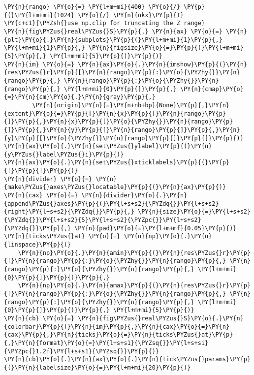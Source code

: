 \begin{Verbatim}[commandchars=\\\{\}]
\PY{n}{rango} \PY{o}{=} \PY{l+m+mi}{400} \PY{o}{/} \PY{p}{(}\PY{l+m+mi}{1024} \PY{o}{/} \PY{n}{nkx}\PY{p}{)}
\PY{c+c1}{\PYZsh{}use np.clip for truncating the Z range}
\PY{n}{fig\PYZus{}real\PYZus{}S}\PY{p}{,} \PY{n}{ax} \PY{o}{=} \PY{n}{plt}\PY{o}{.}\PY{n}{subplots}\PY{p}{(}\PY{l+m+mi}{1}\PY{p}{,} \PY{l+m+mi}{1}\PY{p}{,} \PY{n}{figsize}\PY{o}{=}\PY{p}{(}\PY{l+m+mi}{5}\PY{p}{,} \PY{l+m+mi}{5}\PY{p}{)}\PY{p}{)}
\PY{n}{im} \PY{o}{=} \PY{n}{ax}\PY{o}{.}\PY{n}{imshow}\PY{p}{(}\PY{n}{res\PYZus{}r}\PY{p}{[}\PY{n}{rango}\PY{p}{:}\PY{o}{\PYZhy{}}\PY{n}{rango}\PY{p}{,} \PY{n}{rango}\PY{p}{:}\PY{o}{\PYZhy{}}\PY{n}{rango}\PY{p}{,} \PY{l+m+mi}{0}\PY{p}{]}\PY{p}{,} \PY{n}{cmap}\PY{o}{=}\PY{n}{cm}\PY{o}{.}\PY{n}{gray}\PY{p}{,}
        \PY{n}{origin}\PY{o}{=}\PY{n+nb+bp}{None}\PY{p}{,}\PY{n}{extent}\PY{o}{=}\PY{p}{[}\PY{n}{x}\PY{p}{[}\PY{n}{rango}\PY{p}{]}\PY{p}{,}\PY{n}{x}\PY{p}{[}\PY{o}{\PYZhy{}}\PY{n}{rango}\PY{p}{]}\PY{p}{,}\PY{n}{y}\PY{p}{[}\PY{n}{rango}\PY{p}{]}\PY{p}{,}\PY{n}{y}\PY{p}{[}\PY{o}{\PYZhy{}}\PY{n}{rango}\PY{p}{]}\PY{p}{]}\PY{p}{)}
\PY{n}{ax}\PY{o}{.}\PY{n}{set\PYZus{}ylabel}\PY{p}{(}\PY{n}{y\PYZus{}label\PYZus{}i}\PY{p}{)}
\PY{n}{ax}\PY{o}{.}\PY{n}{set\PYZus{}xticklabels}\PY{p}{(}\PY{p}{[}\PY{p}{]}\PY{p}{)}
\PY{n}{divider} \PY{o}{=} \PY{n}{make\PYZus{}axes\PYZus{}locatable}\PY{p}{(}\PY{n}{ax}\PY{p}{)}
\PY{n}{cax} \PY{o}{=} \PY{n}{divider}\PY{o}{.}\PY{n}{append\PYZus{}axes}\PY{p}{(}\PY{l+s+s2}{\PYZdq{}}\PY{l+s+s2}{right}\PY{l+s+s2}{\PYZdq{}}\PY{p}{,} \PY{n}{size}\PY{o}{=}\PY{l+s+s2}{\PYZdq{}}\PY{l+s+s2}{5}\PY{l+s+s2}{\PYZpc{}}\PY{l+s+s2}{\PYZdq{}}\PY{p}{,} \PY{n}{pad}\PY{o}{=}\PY{l+m+mf}{0.05}\PY{p}{)}
\PY{n}{ticks\PYZus{}at} \PY{o}{=} \PY{n}{np}\PY{o}{.}\PY{n}{linspace}\PY{p}{(}
    \PY{n}{np}\PY{o}{.}\PY{n}{amin}\PY{p}{(}\PY{n}{res\PYZus{}r}\PY{p}{[}\PY{n}{rango}\PY{p}{:}\PY{o}{\PYZhy{}}\PY{n}{rango}\PY{p}{,} \PY{n}{rango}\PY{p}{:}\PY{o}{\PYZhy{}}\PY{n}{rango}\PY{p}{,} \PY{l+m+mi}{0}\PY{p}{]}\PY{p}{)}\PY{p}{,}
    \PY{n}{np}\PY{o}{.}\PY{n}{amax}\PY{p}{(}\PY{n}{res\PYZus{}r}\PY{p}{[}\PY{n}{rango}\PY{p}{:}\PY{o}{\PYZhy{}}\PY{n}{rango}\PY{p}{,} \PY{n}{rango}\PY{p}{:}\PY{o}{\PYZhy{}}\PY{n}{rango}\PY{p}{,} \PY{l+m+mi}{0}\PY{p}{]}\PY{p}{)}\PY{p}{,} \PY{l+m+mi}{5}\PY{p}{)}
\PY{n}{cb} \PY{o}{=} \PY{n}{fig\PYZus{}real\PYZus{}S}\PY{o}{.}\PY{n}{colorbar}\PY{p}{(}\PY{n}{im}\PY{p}{,}\PY{n}{cax}\PY{o}{=}\PY{n}{cax}\PY{p}{,}\PY{n}{ticks}\PY{o}{=}\PY{n}{ticks\PYZus{}at}\PY{p}{,}\PY{n}{format}\PY{o}{=}\PY{l+s+s1}{\PYZsq{}}\PY{l+s+si}{\PYZpc{}1.2f}\PY{l+s+s1}{\PYZsq{}}\PY{p}{)}
\PY{n}{cb}\PY{o}{.}\PY{n}{ax}\PY{o}{.}\PY{n}{tick\PYZus{}params}\PY{p}{(}\PY{n}{labelsize}\PY{o}{=}\PY{l+m+mi}{20}\PY{p}{)}

\end{Verbatim}
